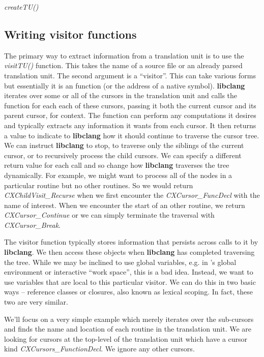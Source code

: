 \documentclass[article]{jss}
\def\R{\proglang{R}}
\def\Rfunc#1{\textsl{#1()}}
\def\Rvar#1{\textsl{#1}}
\def\libclang{\textbf{libclang}}
\begin{document}
\Rfunc{createTU}


\subsection{Writing visitor functions}


The primary way to extract information from a translation unit is to
use the \Rfunc{visitTU} function.  This takes the name of a source
file or an already parsed translation unit.  The second argument is a
``visitor''.  This can take various forms but essentially it is an
\R{} function (or the address of a native symbol).  \libclang{}
iterates over some or all of the cursors in the translation unit and
calls the \R{} function for each each of these cursors, passing it
both the current cursor and its parent cursor, for context.  The
function can perform any computations it desires and typically
extracts any information it wants from each cursor. 
It then returns a
value to indicate to \libclang{} how it should continue to traverse
the cursor tree.  We can instruct \libclang{} to stop, to traverse
only the siblings of the current cursor, or to recursively process the
child cursors.  We can specify a different return value for each call
and so change how \libclang{} traverses the tree dynamically.  For
example, we might want to process all of the nodes in a particular
routine but no other routines. So we would return
\Rvar{CXChildVisit_Recurse} when we first encounter the \Rvar{CXCursor_FuncDecl}%
with the name of interest.  When we encounter the start of an other routine, we return
\Rvar{CXCursor_Continue} or we can simply terminate the traversal with
\Rvar{CXCursor_Break}.

The visitor function typically stores information that persists across
calls to it by \libclang.  We then access these objects when
\libclang{} has completed traversing the tree.  While we may be
inclined to use global variables, e.g. in \R{}'s global environment or
interactive ``work space'', this is a bad idea.  Instead, we want to
use variables that are local to this particular visitor.  We can do
this in two basic ways -- reference classes or closures, also known as
lexical scoping.  In fact, these two are very similar.

We'll focus on a very simple example which merely
iterates over the sub-cursors and finds the name and location of each
routine in the translation unit.  We are looking for cursors at the
top-level of the translation unit which have a cursor kind
\Rvar{CXCursors_FunctionDecl}.  We ignore any other cursors.
\end{document}
